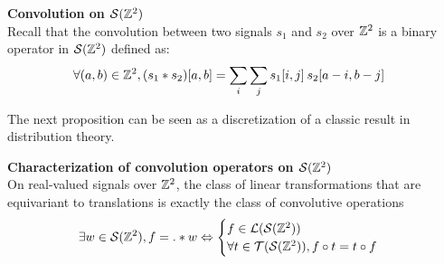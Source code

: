 \begin{definition}\textbf{Convolution on $\cs(\bbz^2)$}\\
Recall that the convolution between two signals $s_1$ and $s_2$ over $\bbz^2$ is a binary operator in $\cs(\bbz^2)$ defined as:
\begin{align*}
\forall (a,b) \in \bbz^2, (s_1 * s_2) [a,b] & = \displaystyle \sum_i \sum_j s_1[i,j] \h{2} s_2[a-i, b-j]
\end{align*}
\end{definition}

The next proposition can be seen as a discretization of a classic result in distribution theory.

\begin{proposition}\textbf{Characterization of convolution operators on $\cs(\bbz^2)$}\\
On real-valued signals over $\bbz^2$, the class of linear transformations that are equivariant to translations is exactly the class of convolutive operations \ie
\begin{gather*}
\exists w \in \cs(\bbz^2), f = . \ast w \Leftrightarrow
\begin{cases}
 f \in \cl(\cs(\bbz^2))\\
 \forall t \in \ct(\cs(\bbz^2)), f \circ t = t \circ f
\end{cases}
\end{gather*}
\label{prop:equi}
\end{proposition}

